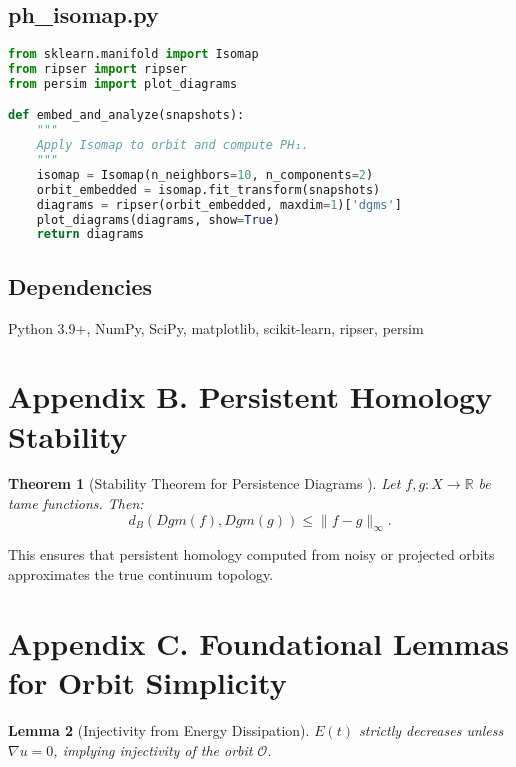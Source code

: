 \documentclass[11pt]{article}
\newtheorem{theorem}{Theorem}[section]
\newtheorem{lemma}[theorem]{Lemma}
\theoremstyle{definition}
\begin{document}
\subsection*{ph\_isomap.py}
\begin{lstlisting}[language=Python]
from sklearn.manifold import Isomap
from ripser import ripser
from persim import plot_diagrams

def embed_and_analyze(snapshots):
    """
    Apply Isomap to orbit and compute PH₁.
    """
    isomap = Isomap(n_neighbors=10, n_components=2)
    orbit_embedded = isomap.fit_transform(snapshots)
    diagrams = ripser(orbit_embedded, maxdim=1)['dgms']
    plot_diagrams(diagrams, show=True)
    return diagrams
\end{lstlisting}

\subsection*{Dependencies}
Python 3.9+, NumPy, SciPy, matplotlib, scikit-learn, ripser, persim


\section{Appendix B. Persistent Homology Stability}
\label{sec:appendixB}

\begin{theorem}[Stability Theorem for Persistence Diagrams \cite{CohenSteiner2007}]
Let $f, g : X \to \mathbb{R}$ be tame functions. Then:
\[
d_B(Dgm(f), Dgm(g)) \le \|f - g\|_\infty.
\]
\end{theorem}

This ensures that persistent homology computed from noisy or projected orbits approximates the true continuum topology.


\section*{Appendix C. Foundational Lemmas for Orbit Simplicity}
\label{sec:appendixC}

\begin{lemma}[Injectivity from Energy Dissipation]
$E(t)$ strictly decreases unless $\nabla u = 0$, implying injectivity of the orbit $\mathcal{O}$.
\end{lemma}
\end{document}
